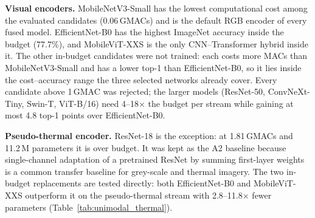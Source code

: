 \textbf{Visual encoders.} MobileNetV3-Small has the lowest computational cost among the evaluated candidates (0.06\,GMACs) and is the default RGB encoder of every fused model. EfficientNet-B0 has the highest ImageNet accuracy inside the budget (77.7\%), and MobileViT-XXS is the only CNN--Transformer hybrid inside it. The other in-budget candidates were not trained: each costs more MACs than MobileNetV3-Small and has a lower top-1 than EfficientNet-B0, so it lies inside the cost--accuracy range the three selected networks already cover. Every candidate above 1\,GMAC was rejected; the larger models (ResNet-50, ConvNeXt-Tiny, Swin-T, ViT-B/16) need 4--18$\times$ the budget per stream while gaining at most 4.8 top-1 points over EfficientNet-B0.

\textbf{Pseudo-thermal encoder.} ResNet-18 is the exception: at 1.81\,GMACs and 11.2\,M parameters it is over budget. It was kept as the A2 baseline because single-channel adaptation of a pretrained ResNet by summing first-layer weights is a common transfer baseline for grey-scale and thermal imagery. The two in-budget replacements are tested directly: both EfficientNet-B0 and MobileViT-XXS outperform it on the pseudo-thermal stream with 2.8--11.8$\times$ fewer parameters (Table~\ref{tab:unimodal_thermal}).

\begin{table}[H]
\centering
\caption[Audio backbone candidates]{Audio backbone candidates ($1\times64\times63$ log-mel input). Lower rows are full-network figures from Kong et al.~\cite{kong2020panns}, shown for scale.}
\label{tab:audio_candidates}
\end{table}


